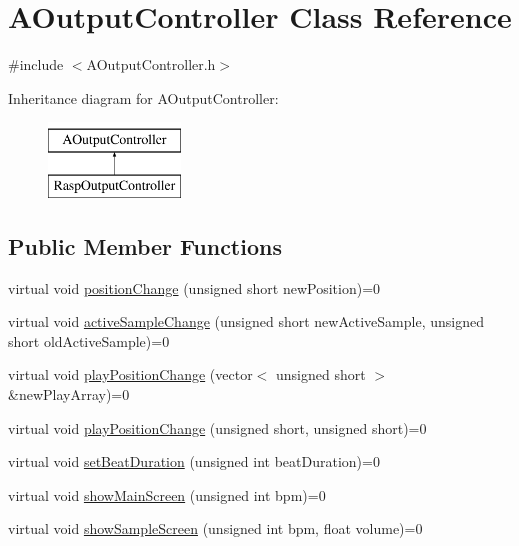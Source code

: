 \hypertarget{class_a_output_controller}{}\section{A\+Output\+Controller Class Reference}
\label{class_a_output_controller}


{\ttfamily \#include $<$A\+Output\+Controller.\+h$>$}

Inheritance diagram for A\+Output\+Controller\+:\begin{figure}[H]
\begin{center}
\leavevmode
\includegraphics[height=2.000000cm]{class_a_output_controller}
\end{center}
\end{figure}
\subsection*{Public Member Functions}
\begin{DoxyCompactItemize}
\item 
virtual void \hyperlink{class_a_output_controller_a5a818a40e2911411d378032b8b2fb6c8}{position\+Change} (unsigned short new\+Position)=0
\item 
virtual void \hyperlink{class_a_output_controller_ac2b87aa6291c38cc65185bf6a37ae300}{active\+Sample\+Change} (unsigned short new\+Active\+Sample, unsigned short old\+Active\+Sample)=0
\item 
virtual void \hyperlink{class_a_output_controller_a7bad658dfc3eb1223ace0c0454130818}{play\+Position\+Change} (vector$<$ unsigned short $>$ \&new\+Play\+Array)=0
\item 
virtual void \hyperlink{class_a_output_controller_a15c1300df5606bf7d4838b41a45c31e3}{play\+Position\+Change} (unsigned short, unsigned short)=0
\item 
virtual void \hyperlink{class_a_output_controller_ac685432fc57d2441ecb548386554d2c9}{set\+Beat\+Duration} (unsigned int beat\+Duration)=0
\item 
virtual void \hyperlink{class_a_output_controller_ace7df9de71110b3615156b9bd06a9349}{show\+Main\+Screen} (unsigned int bpm)=0
\item 
virtual void \hyperlink{class_a_output_controller_aab53d12a6aa6f38d0e4ead69e85ed4fe}{show\+Sample\+Screen} (unsigned int bpm, float volume)=0
\end{DoxyCompactItemize}


